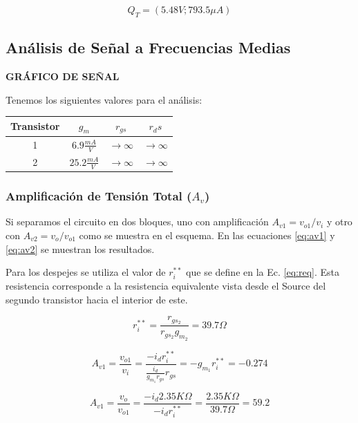 \documentclass[a4paper, 10pt, spanish]{article}
\begin{document}
  \begin{equation}
    Q_T=(5.48V;793.5\mu A)
  \end{equation}

\subsection{Análisis de Señal a Frecuencias Medias}

\textbf{GRÁFICO DE SEÑAL}

Tenemos los siguientes valores para el análisis:
\begin{center}
   \begin{tabular}{|c|c|c|c|}
     \hline
    Transistor & $g_m$ & $r_{gs}$ & $r_ds$  \\
    \hline
    1 & $6.9\frac{mA}{V}$ & $\rightarrow \infty$ & $\rightarrow \infty$ \\
    \hline
    2 & $25.2\frac{mA}{V}$ & $\rightarrow \infty$ & $\rightarrow \infty$ \\
    \hline
   \end{tabular}
\end{center}

\subsubsection{Amplificación de Tensión Total ($A_v$)}

Si separamos el circuito en dos bloques, uno con amplificación $A_{v1}=v_{o1}/v_i$ y otro con $A_{v2}=v_o/v_{o1}$ como se muestra en el esquema. En las ecuaciones \ref{eq:av1} y \ref{eq:av2} se muestran los resultados.

Para los despejes se utiliza el valor de $r_i^{**}$ que se define en la Ec. \ref{eq:req}. Esta resistencia corresponde a la resistencia equivalente vista desde el Source del segundo transistor hacia el interior de este.

\begin{equation}
  r_i^{**}=\frac{r_{gs_2}}{r_{gs_2} g_{m_2}} = 39.7 \Omega
  \label{eq:req}
\end{equation}

\begin{equation}
  A_{v1}=\frac{v_{o1}}{v_i}=\frac{-i_d r_i^{**}}{\frac{i_d}{g_{m_1} r_{gs}}r_{gs}}=-g_{m_1} r_i^{**} = -0.274
  \label{eq:av1}
\end{equation}

\begin{equation}
  A_{v1}=\frac{v_{o}}{v_{o1}}=\frac{-i_d 2.35K\Omega}{-i_d r_i^{**}}=\frac{2.35K\Omega}{39.7\Omega} = 59.2
  \label{eq:av2}
\end{equation}
\end{document}
